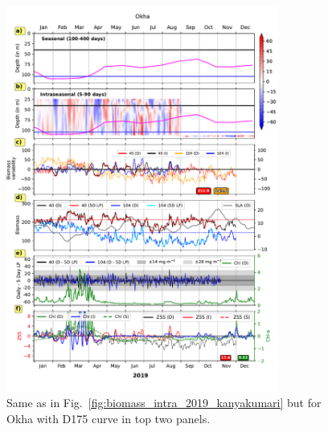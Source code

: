 \documentclass[12pt,a4paper]{article}
\begin{document}
\begin{figure}[htbp]
	\centering
	\includegraphics[width=0.8\textwidth]{./figures/biomass_intra_2019_okha.pdf} 
	\caption{Same as in Fig.~\ref{fig:biomass_intra_2019_kanyakumari} but for Okha with D175 curve in top two panels.}		
	\label{fig:biomass_intra_2019_okha}
\end{figure}
\end{document}
